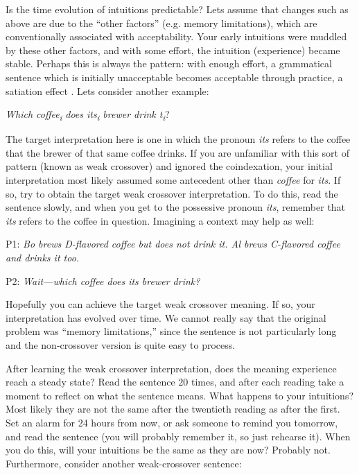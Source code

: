   Is the time evolution of intuitions predictable? Lets assume that changes such as above are due to the “other factors” (e.g. memory limitations), which are conventionally associated with acceptability. Your early intuitions were muddled by these other factors, and with some effort, the intuition (experience) became stable. Perhaps this is always the pattern: with enough effort, a grammatical sentence which is initially unacceptable becomes acceptable through practice, a satiation effect \citep{Snyder2000}. Lets consider another example:

    \textit{Which coffee\textsubscript{i} does its\textsubscript{i} brewer drink t\textsubscript{i}}?

  The target interpretation here is one in which the pronoun \textit{its} refers to the coffee that the brewer of that same coffee drinks. If you are unfamiliar with this sort of pattern (known as weak crossover) and ignored the coindexation, your initial interpretation most likely assumed some antecedent other than \textit{coffee} for \textit{its}. If so, try to obtain the target weak crossover interpretation. To do this, read the sentence slowly, and when you get to the possessive pronoun \textit{its}, remember that \textit{its} refers to the coffee in question. Imagining a context may help as well:

P1: \textit{Bo brews D-flavored coffee but does not drink it. Al brews C-flavored coffee and drinks it too.} 

P2: \textit{Wait—which coffee does its brewer drink?}

  Hopefully you can achieve the target weak crossover meaning. If so, your interpretation has evolved over time. We cannot really say that the original problem was “memory limitations,” since the sentence is not particularly long and the non-crossover version is quite easy to process. 

  After learning the weak crossover interpretation, does the meaning experience reach a steady state? Read the sentence 20 times, and after each reading take a moment to reflect on what the sentence means. What happens to your intuitions? Most likely they are not the same after the twentieth reading as after the first. Set an alarm for 24 hours from now, or ask someone to remind you tomorrow, and read the sentence (you will probably remember it, so just rehearse it). When you do this, will your intuitions be the same as they are now? Probably not. Furthermore, consider another weak-crossover sentence: 

